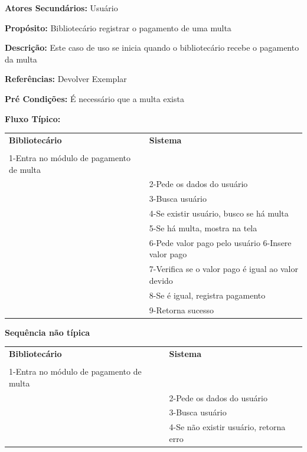 \documentclass[
	12pt,				%
	openright,			%
	oneside,			%
	a4paper,			%
	english,			%
	brazil				%
	]{abntex2}
\begin{document}
\textbf{Atores Secundários:} Usuário

\textbf{Propósito:}      Bibliotecário registrar o pagamento de uma multa

\textbf{Descrição:}      Este caso de uso se inicia quando o bibliotecário recebe o pagamento da multa

\textbf{Referências:}  Devolver Exemplar

\textbf{Pré Condições:} É necessário que a multa exista

\textbf{Fluxo Típico:} 

\begin{table}[H]
\ABNTEXfontereduzida
\begin{center}
\begin{tabular}{p{5.5cm} p{5.5cm}}
    \textbf{Bibliotecário} & \textbf{Sistema}\\
     & \\
    1-Entra no módulo de pagamento de multa & \\
     & 2-Pede os dados do usuário\\
     & 3-Busca usuário \\
     & 4-Se existir usuário, busco se há multa\\
     & 5-Se há multa, mostra na tela\\
     & 6-Pede valor pago pelo usuário
    6-Insere valor pago\\
     & 7-Verifica se o valor pago é igual ao valor devido \\
     & 8-Se é igual, registra pagamento\\
     & 9-Retorna sucesso\\
\end{tabular}
\end{center}
\end{table} 
                
\textbf{Sequência não típica}

\begin{table}[H]
\ABNTEXfontereduzida
\begin{center}
\begin{tabular}{p{5.5cm} p{5.5cm}}
    \textbf{Bibliotecário} & \textbf{Sistema}\\
     & \\
    1-Entra no módulo de pagamento de multa & \\
     & 2-Pede os dados do usuário\\
     & 3-Busca usuário \\
     & 4-Se não existir usuário, retorna erro\\
\end{tabular}
\end{center}
\end{table} 
\end{document}
